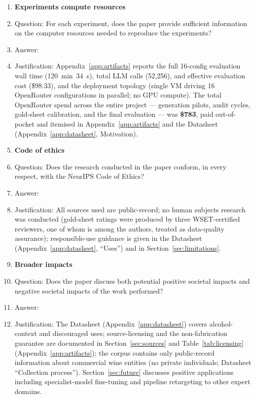 \begin{enumerate}
\item {\bf Experiments compute resources}
    \item[] Question: For each experiment, does the paper provide sufficient information on the computer resources needed to reproduce the experiments?
    \item[] Answer: \answerYes{}
    \item[] Justification: Appendix~\ref{app:artifacts} reports the full 16-config evaluation wall time (120~min~34~s), total LLM calls (52{,}256), and effective evaluation cost (\$98.33), and the deployment topology (single VM driving 16 OpenRouter configurations in parallel; no GPU compute). The total OpenRouter spend across the entire project --- generation pilots, audit cycles, gold-sheet calibration, and the final evaluation --- was \textbf{\$783}, paid out-of-pocket and itemised in Appendix~\ref{app:artifacts} and the Datasheet (Appendix~\ref{app:datasheet}, Motivation).

\item {\bf Code of ethics}
    \item[] Question: Does the research conducted in the paper conform, in every respect, with the NeurIPS Code of Ethics?
    \item[] Answer: \answerYes{}
    \item[] Justification: All sources used are public-record; no human subjects research was conducted (gold-sheet ratings were produced by three WSET-certified reviewers, one of whom is among the authors, treated as data-quality assurance); responsible-use guidance is given in the Datasheet (Appendix~\ref{app:datasheet}, ``Uses'') and in Section~\ref{sec:limitations}.

\item {\bf Broader impacts}
    \item[] Question: Does the paper discuss both potential positive societal impacts and negative societal impacts of the work performed?
    \item[] Answer: \answerYes{}
    \item[] Justification: The Datasheet (Appendix~\ref{app:datasheet}) covers alcohol-context and discouraged uses; source-licensing and the non-fabrication guarantee are documented in Section~\ref{sec:sources} and Table~\ref{tab:licensing} (Appendix~\ref{app:artifacts}); the corpus contains only public-record information about commercial wine entities (no private individuals; Datasheet ``Collection process''). Section~\ref{sec:future} discusses positive applications including specialist-model fine-tuning and pipeline retargeting to other expert domains.


\end{enumerate}
